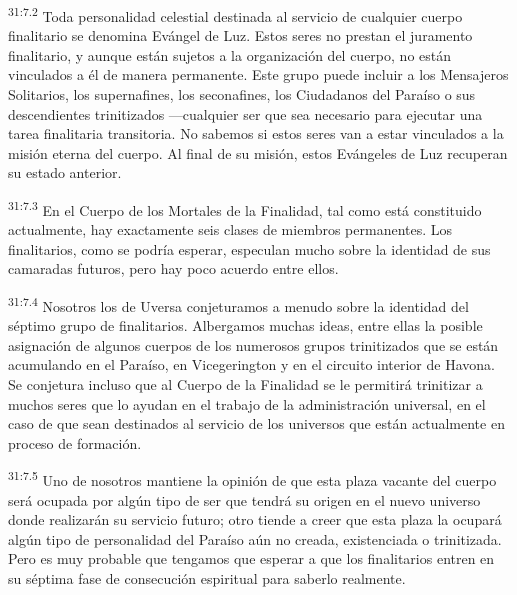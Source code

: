 \par
\textsuperscript{31:7.2} Toda personalidad celestial destinada al servicio de cualquier cuerpo finalitario se denomina Evángel de Luz. Estos seres no prestan el juramento finalitario, y aunque están sujetos a la organización del cuerpo, no están vinculados a él de manera permanente. Este grupo puede incluir a los Mensajeros Solitarios, los supernafines, los seconafines, los Ciudadanos del Paraíso o sus descendientes trinitizados ---cualquier ser que sea necesario para ejecutar una tarea finalitaria transitoria. No sabemos si estos seres van a estar vinculados a la misión eterna del cuerpo. Al final de su misión, estos Evángeles de Luz recuperan su estado anterior.

\par
\textsuperscript{31:7.3} En el Cuerpo de los Mortales de la Finalidad, tal como está constituido actualmente, hay exactamente seis clases de miembros permanentes. Los finalitarios, como se podría esperar, especulan mucho sobre la identidad de sus camaradas futuros, pero hay poco acuerdo entre ellos.

\par
\textsuperscript{31:7.4} Nosotros los de Uversa conjeturamos a menudo sobre la identidad del séptimo grupo de finalitarios. Albergamos muchas ideas, entre ellas la posible asignación de algunos cuerpos de los numerosos grupos trinitizados que se están acumulando en el Paraíso, en Vicegerington y en el circuito interior de Havona. Se conjetura incluso que al Cuerpo de la Finalidad se le permitirá trinitizar a muchos seres que lo ayudan en el trabajo de la administración universal, en el caso de que sean destinados al servicio de los universos que están actualmente en proceso de formación.

\par
\textsuperscript{31:7.5} Uno de nosotros mantiene la opinión de que esta plaza vacante del cuerpo será ocupada por algún tipo de ser que tendrá su origen en el nuevo universo donde realizarán su servicio futuro; otro tiende a creer que esta plaza la ocupará algún tipo de personalidad del Paraíso aún no creada, existenciada o trinitizada. Pero es muy probable que tengamos que esperar a que los finalitarios entren en su séptima fase de consecución espiritual para saberlo realmente.


